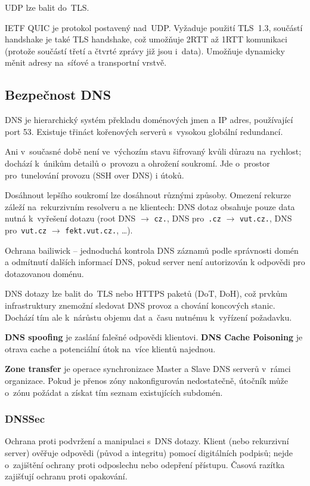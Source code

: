 UDP lze balit do~TLS.

IETF QUIC je protokol postavený nad~UDP.
Vyžaduje použití TLS~1.3, součástí handshake je také TLS handshake, což umožňuje 2RTT až 1RTT komunikaci (protože součástí třetí a čtvrté zprávy již jsou i~data).
Umožňuje dynamicky měnit adresy na~síťové a transportní vrstvě.



\subsection{Bezpečnost DNS}

DNS je hierarchický systém překladu doménových jmen a IP adres, používající port 53.
Existuje třináct kořenových serverů s~vysokou globální redundancí.

Ani v~současné době není ve~výchozím stavu šifrovaný kvůli důrazu na~rychlost; dochází k~únikům detailů o~provozu a ohrožení soukromí.
Jde o~prostor pro~tunelování provozu (SSH over DNS) i útoků.

Dosáhnout lepšího soukromí lze dosáhnout různými způsoby.
Omezení rekurze záleží na~rekurzivním resolveru a ne klientech: DNS dotaz obsahuje pouze data nutná k~vyřešení dotazu (root DNS $\rightarrow$ \texttt{cz.}, DNS pro~\texttt{.cz} $\rightarrow$ \texttt{vut.cz.}, DNS pro~\texttt{vut.cz} $\rightarrow$ \texttt{fekt.vut.cz.}, \dots).

Ochrana bailiwick – jednoduchá kontrola DNS záznamů podle správnosti domén a odmítnutí dalších informací DNS, pokud server není autorizován k odpovědi pro dotazovanou doménu. 

DNS dotazy lze balit do~TLS nebo HTTPS paketů  (DoT, DoH), což prvkům infrastruktury znemožní sledovat DNS provoz a chování koncových stanic.
Dochází tím ale k~nárůstu objemu dat a~času nutnému k~vyřízení požadavku.

\textbf{DNS spoofing} je zaslání falešné odpovědi klientovi.
\textbf{DNS Cache Poisoning} je otrava cache a potenciální útok na~více klientů najednou.

\textbf{Zone transfer} je operace synchronizace Master a Slave DNS serverů v~rámci organizace.
Pokud je přenos zóny nakonfigurován nedostatečně, útočník může o~zónu požádat a získat tím seznam existujících subdomén.


\subsubsection{DNSSec}

Ochrana proti podvržení a manipulaci s~DNS dotazy.
Klient (nebo rekurzivní server) ověřuje odpovědi (původ a integritu) pomocí digitálních podpisů; nejde o~zajištění ochrany proti odposlechu nebo odepření přístupu.
Časová razítka zajišťují ochranu proti opakování.

